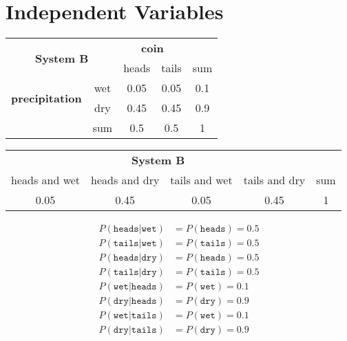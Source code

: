 \section{Independent Variables}

\begin{center}
 \begin{tabular}{c c || c | c || c}
 \multicolumn{2}{c}{\multirow{2}{*}{\textbf{System B}}} & \multicolumn{2}{c}{\textbf{coin}} & {}\\
\multicolumn{2}{c}{} & heads & tails & sum \\ [0.5ex]
 \hline\hline
\multirow{2}{*}{\textbf{precipitation}} & wet & 0.05 & 0.05 & 0.1 \\
 \cline{2-5}
 & dry & 0.45 & 0.45 & 0.9 \\
 \hline\hline
  {} & sum & 0.5 & 0.5 & 1 \\ [1ex]
\end{tabular}
\end{center}

\begin{center}

  \begin{tabular}{c | c | c | c || c}
   \multicolumn{4}{c}{\textbf{System B}} & {}\\
   heads and wet & heads and dry & tails and wet & tails and dry & sum \\ [0.5ex]
  \hline\hline
   0.05 & 0.45 & 0.05 & 0.45 & 1 \\ [1ex]
 \end{tabular}

\end{center}


\begin{align*}
P(\texttt{heads} | \texttt{wet}) &= P(\texttt{heads}) = 0.5 \\
P(\texttt{tails} | \texttt{wet}) &= P(\texttt{tails}) = 0.5 \\
P(\texttt{heads} | \texttt{dry}) &= P(\texttt{heads}) = 0.5 \\
P(\texttt{tails} | \texttt{dry}) &= P(\texttt{tails}) = 0.5 \\
P(\texttt{wet} | \texttt{heads}) &= P(\texttt{wet}) = 0.1 \\
P(\texttt{dry} | \texttt{heads}) &= P(\texttt{dry}) = 0.9 \\
P(\texttt{wet} | \texttt{tails}) &= P(\texttt{wet}) = 0.1 \\
P(\texttt{dry} | \texttt{tails}) &= P(\texttt{dry}) = 0.9
\end{align*}

